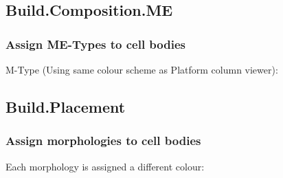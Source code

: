 \documentclass{beamer}
\begin{document}
\subsection{Build.Composition.ME}
\begin{frame}
  \frametitle{Assign ME-Types to cell bodies}
  M-Type (Using same colour scheme as Platform column viewer):
  
\end{frame}

\subsection{Build.Placement}
\begin{frame}
  \frametitle{Assign morphologies to cell bodies}
  Each morphology is assigned a different colour:

\end{frame}
\end{document}
